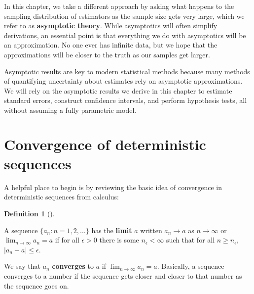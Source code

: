 \documentclass[
  letterpaper,
  DIV=11,
  numbers=noendperiod]{scrreprt}
\theoremstyle{plain}
\theoremstyle{definition}
\theoremstyle{definition}
\newtheorem{definition}{Definition}[chapter]
\theoremstyle{remark}
\begin{document}
In this chapter, we take a different approach by asking what happens to
the sampling distribution of estimators as the sample size gets very
large, which we refer to as \textbf{asymptotic theory}. While
asymptotics will often simplify derivations, an essential point is that
everything we do with asymptotics will be an approximation. No one ever
has infinite data, but we hope that the approximations will be closer to
the truth as our samples get larger.

Asymptotic results are key to modern statistical methods because many
methods of quantifying uncertainty about estimates rely on asymptotic
approximations. We will rely on the asymptotic results we derive in this
chapter to estimate standard errors, construct confidence intervals, and
perform hypothesis tests, all without assuming a fully parametric model.

\hypertarget{convergence-of-deterministic-sequences}{%
\section{Convergence of deterministic
sequences}\label{convergence-of-deterministic-sequences}}

A helpful place to begin is by reviewing the basic idea of convergence
in deterministic sequences from calculus:

\begin{definition}[]\protect\hypertarget{def-limit}{}\label{def-limit}

A sequence \(\{a_n: n = 1, 2, \ldots\}\) has the \textbf{limit} \(a\)
written \(a_n \rightarrow a\) as \(n\rightarrow \infty\) or
\(\lim_{n\rightarrow \infty} a_n = a\) if for all \(\epsilon > 0\) there
is some \(n_{\epsilon} < \infty\) such that for all
\(n \geq n_{\epsilon}\), \(|a_n - a| \leq \epsilon\).

\end{definition}

We say that \(a_n\) \textbf{converges} to \(a\) if
\(\lim_{n\rightarrow\infty} a_n = a\). Basically, a sequence converges
to a number if the sequence gets closer and closer to that number as the
sequence goes on.
\end{document}

